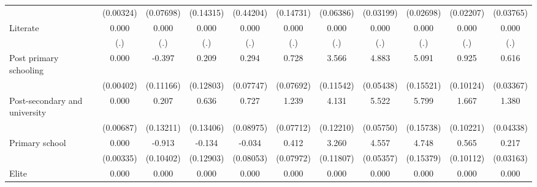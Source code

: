 {\begin{tabular}{l*{10}{c}}
                    &   (0.00324)         &   (0.07698)         &   (0.14315)         &   (0.44204)         &   (0.14731)         &   (0.06386)         &   (0.03199)         &   (0.02698)         &   (0.02207)         &   (0.03765)         \\
Literate            &       0.000         &       0.000         &       0.000         &       0.000         &       0.000         &       0.000         &       0.000         &       0.000         &       0.000         &       0.000         \\
                    &         (.)         &         (.)         &         (.)         &         (.)         &         (.)         &         (.)         &         (.)         &         (.)         &         (.)         &         (.)         \\
Post primary schooling&       0.000         &      -0.397\sym{***}&       0.209         &       0.294\sym{***}&       0.728\sym{***}&       3.566\sym{***}&       4.883\sym{***}&       5.091\sym{***}&       0.925\sym{***}&       0.616\sym{***}\\
                    &   (0.00402)         &   (0.11166)         &   (0.12803)         &   (0.07747)         &   (0.07692)         &   (0.11542)         &   (0.05438)         &   (0.15521)         &   (0.10124)         &   (0.03367)         \\
Post-secondary and university&       0.000         &       0.207         &       0.636\sym{***}&       0.727\sym{***}&       1.239\sym{***}&       4.131\sym{***}&       5.522\sym{***}&       5.799\sym{***}&       1.667\sym{***}&       1.380\sym{***}\\
                    &   (0.00687)         &   (0.13211)         &   (0.13406)         &   (0.08975)         &   (0.07712)         &   (0.12210)         &   (0.05750)         &   (0.15738)         &   (0.10221)         &   (0.04338)         \\
Primary school      &       0.000         &      -0.913\sym{***}&      -0.134         &      -0.034         &       0.412\sym{***}&       3.260\sym{***}&       4.557\sym{***}&       4.748\sym{***}&       0.565\sym{***}&       0.217\sym{***}\\
                    &   (0.00335)         &   (0.10402)         &   (0.12903)         &   (0.08053)         &   (0.07972)         &   (0.11807)         &   (0.05357)         &   (0.15379)         &   (0.10112)         &   (0.03163)         \\
Elite               &       0.000         &       0.000         &       0.000         &       0.000         &       0.000         &       0.000         &       0.000         &       0.000         &       0.000         &       0.000         \\

\end{tabular}}
